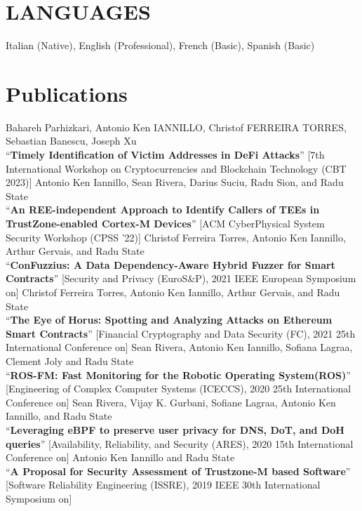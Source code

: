 \documentclass[margin,line]{resume}
\begin{document}
\begin{resume}
\filbreak
\section{\mysidestyle LANGUAGES} 
Italian (Native), English (Professional), French (Basic), Spanish (Basic)

\filbreak
\section{\mysidestyle Publications}

\filbreak
Bahareh Parhizkari, Antonio Ken IANNILLO, Christof FERREIRA TORRES, Sebastian Banescu, Joseph Xu\\
``\textbf{Timely Identification of Victim Addresses in DeFi Attacks}''
[7th International Workshop on Cryptocurrencies and Blockchain Technology (CBT 2023)]
\filbreak
Antonio Ken Iannillo, Sean Rivera, Darius Suciu, Radu Sion, and Radu State\\
``\textbf{An REE-independent Approach to Identify Callers of TEEs in TrustZone-enabled Cortex-M Devices}''
[ACM CyberPhysical System Security Workshop (CPSS ’22)]
\filbreak
Christof Ferreira Torres, Antonio Ken Iannillo, Arthur Gervais, and Radu State\\
``\textbf{ConFuzzius: A Data Dependency-Aware Hybrid Fuzzer for Smart Contracts}''
[Security and Privacy (EuroS\&P), 2021 IEEE European Symposium on]
\filbreak
Christof Ferreira Torres, Antonio Ken Iannillo, Arthur Gervais, and Radu State\\
``\textbf{The Eye of Horus: Spotting and Analyzing Attacks on Ethereum Smart Contracts}''
[Financial Cryptography and Data Security (FC), 2021 25th International Conference on]
\filbreak
Sean Rivera, Antonio Ken Iannillo, Sofiana Lagraa, Clement Joly and Radu State\\
``\textbf{ROS-FM: Fast Monitoring for the Robotic Operating System(ROS)}''
[Engineering of Complex Computer Systems (ICECCS), 2020 25th International Conference on]
\filbreak
Sean Rivera, Vijay K. Gurbani, Sofiane Lagraa, Antonio Ken Iannillo, and Radu State\\
``\textbf{Leveraging eBPF to preserve user privacy for DNS, DoT, and DoH queries}''
[Availability, Reliability, and Security (ARES), 2020 15th International Conference on]
\filbreak
Antonio Ken Iannillo and Radu State\\
``\textbf{A Proposal for Security Assessment of Trustzone-M based Software}''
[Software Reliability Engineering (ISSRE), 2019 IEEE 30th International Symposium on]

\end{resume}
\end{document}
